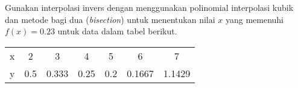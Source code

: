 \begin{soal}
Gunakan interpolasi invers dengan menggunakan polinomial interpolasi kubik dan
metode bagi dua (\textit{bisection}) untuk menentukan nilai $x$ yang memenuhi
$f(x) = 0.23$ untuk data dalam tabel berikut.

{\centering
\begin{tabular}{|c|cccccc|}
\hline
x & 2   &   3   & 4    & 5 & 6 & 7 \\
y & 0.5 & 0.333 & 0.25 & 0.2 & 0.1667 & 1.1429 \\
\hline
\end{tabular}
\par}
\end{soal}